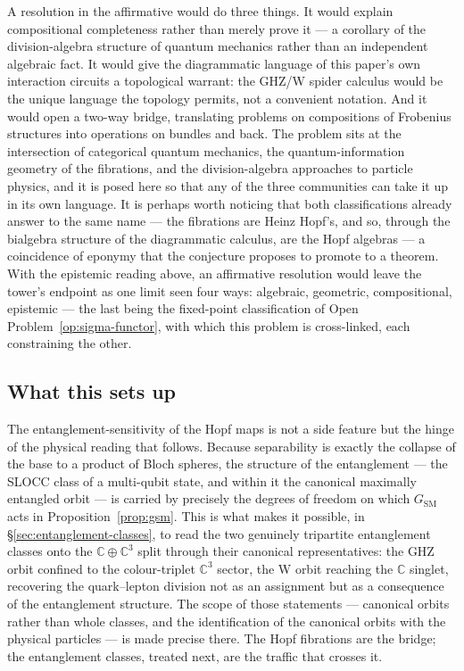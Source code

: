 A resolution in the affirmative would do three things. It would explain compositional
completeness rather than merely prove it --- a corollary of the division-algebra structure of
quantum mechanics rather than an independent algebraic fact. It would give the diagrammatic
language of this paper's own interaction circuits a topological warrant: the GHZ/W spider
calculus would be the unique language the topology permits, not a convenient notation. And it
would open a two-way bridge, translating problems on compositions of Frobenius structures into
operations on bundles and back. The problem sits at the intersection of categorical quantum
mechanics, the quantum-information geometry of the fibrations, and the division-algebra
approaches to particle physics, and it is posed here so that any of the three communities can
take it up in its own language. It is perhaps worth noticing that both classifications already
answer to the same name --- the fibrations are Heinz Hopf's, and so, through the bialgebra
structure of the diagrammatic calculus, are the Hopf algebras --- a coincidence of eponymy that
the conjecture proposes to promote to a theorem. With the epistemic reading above, an
affirmative resolution would leave the tower's endpoint as one limit seen four ways: algebraic,
geometric, compositional, epistemic --- the last being the fixed-point classification of Open
Problem~\ref{op:sigma-functor}, with which this problem is cross-linked, each constraining the
other.

\subsection{What this sets up}

The entanglement-sensitivity of the Hopf maps is not a side feature but the hinge of the
physical reading that follows. Because separability is exactly the collapse of the base to a
product of Bloch spheres, the structure of the entanglement --- the SLOCC class of a multi-qubit
state, and within it the canonical maximally entangled orbit --- is carried by precisely the
degrees of freedom on which $G_{\mathrm{SM}}$ acts in Proposition~\ref{prop:gsm}. This is what
makes it possible, in \S\ref{sec:entanglement-classes}, to read the two genuinely tripartite
entanglement classes onto the $\mathbb{C} \oplus \mathbb{C}^3$ split through their canonical
representatives: the GHZ orbit confined to the colour-triplet $\mathbb{C}^3$ sector, the W orbit
reaching the $\mathbb{C}$ singlet, recovering the quark--lepton division not as an assignment
but as a consequence of the entanglement structure. The scope of those statements --- canonical
orbits rather than whole classes, and the identification of the canonical orbits with the
physical particles --- is made precise there. The Hopf fibrations are the bridge; the
entanglement classes, treated next, are the traffic that crosses it.
